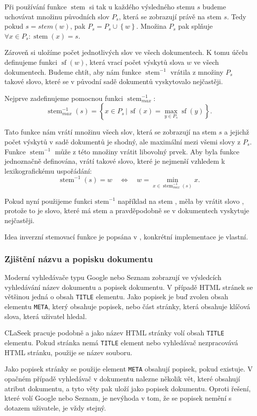 \documentclass[12pt]{article}
\newcommand{\name}{CLaSeek}
\newcommand{\code}[1]{\texttt{#1}}
\newcommand{\sep}{\,|\,}
\newcommand{\sssection}[1]{\subsubsection{#1}}
\newcommand{\adds}[1]{\left\{#1\right\}}
\newcommand{\eq}{\Leftrightarrow}
\DeclareMathOperator{\stem}{stem}
\DeclareMathOperator{\wcount}{sf}
\newcommand{\invstem}{\stem^{-1}}
\begin{document}
Při používání funkce $\stem$ si tak u každého výsledného stemu $s$ budeme uchovávat množinu původních slov $P_s$, která se zobrazují právě na stem $s$. Tedy pokud $s=stem(w)$, pak $P_s=P_s\cup\adds{w}$. Množina $P_s$ pak splňuje $\forall x\in P_s: \stem(x)=s$. 

Zároveň si uložíme počet jednotlivých slov ve všech dokumentech. K tomu účelu definujeme funkci $\wcount(w)$, která vrací počet výskytů slova $w$ ve všech dokumentech. Budeme chtít, aby nám funkce $\invstem$ vrátila z množiny $P_s$ takové slovo, které se v původní sadě dokumentů vyskytovalo nejčastěji. 

Nejprve zadefinujeme pomocnou funkci $\invstem_{max}$:
$$\invstem_{max}(s)=\adds{x\in P_s \sep \wcount(x) = \max_{y\in P_s}\wcount(y)}.$$

Tato funkce nám vrátí množinu všech slov, která se zobrazují na stem $s$ a jejichž počet výskytů v sadě dokumentů je shodný, ale maximální mezi všemi slovy z $P_s$. Funkce $\invstem$ může z této množiny vrátit libovolný prvek. Aby byla funkce jednoznačně definována, vrátí takové slovo, které je nejmenší vzhledem k lexikografickému uspořádání:
$$\invstem(s)=w\quad\eq\quad w=\min_{x\in \invstem_{max}(s)}x.$$

Pokud nyní použijeme funkci $\mbox{stem}^{-1}$ například na stem , měla by vrátit slovo , protože to je slovo, které má stem  a pravděpodobně se v dokumentech vyskytuje nejčastěji. 

Idea inverzní stemovací funkce je popsána v \cite{searchsleuth}, konkrétní implementace je vlastní. 

\sssection{Zjištění názvu a popisku dokumentu}
Moderní vyhledávače typu Google nebo Seznam zobrazují ve výsledcích vyhledávání název dokumentu a popisek dokumentu. V případě HTML stránek se většinou jedná o obsah \code{TITLE} elementu. Jako popisek je buď zvolen obsah elementu \code{META}, který obsahuje popisek, nebo část stránky, která obsahuje klíčová slova, která uživatel hledal. 

\name{} pracuje podobně a jako název HTML stránky volí obsah \code{TITLE} elementu. Pokud stránka nemá \code{TITLE} element nebo vyhledávač nezpracovává HTML stránku, použije se název souboru. 

Jako popisek stránky se použije element \code{META} obsahují popisek, pokud existuje. V opačném případě vyhledávač v dokumentu nalezne několik vět, které obsahují atribut dokumentu, a tyto věty pak uloží jako popisek dokumentu. Oproti řešení, které volí Google nebo Seznam, je nevýhoda v tom, že se popisek nemění s dotazem uživatele, je vždy stejný. 
\end{document}
